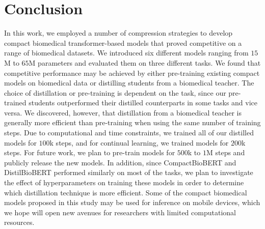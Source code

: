 \documentclass{article}
\begin{document}
\label{disc}

\section{Conclusion}
\label{concl}
In this work, we employed a number of compression strategies to develop compact biomedical transformer-based models that proved competitive on a range of biomedical datasets. We introduced six different models ranging from $15$M to $65$M parameters and evaluated them on three different tasks. We found that competitive performance may be achieved by either pre-training existing compact models on biomedical data or distilling students from a biomedical teacher. The choice of distillation or pre-training is dependent on the task, since our pre-trained students outperformed their distilled counterparts in some tasks and vice versa.
We discovered, however, that distillation from a biomedical teacher is generally more efficient than pre-training when using the same number of training steps. Due to computational and time constraints, we trained all of our distilled models for $100$k steps, and for continual learning, we trained models for $200$k steps. For future work, we plan to pre-train models for $500$k to $1$M steps and publicly release the new models. In addition, since CompactBioBERT and DistilBioBERT performed similarly on most of the tasks, we plan to investigate the effect of hyperparameters on training these models in order to determine which distillation technique is more efficient. Some of the compact biomedical models proposed in this study may be used for inference on mobile devices, which we hope will open new avenues for researchers with limited computational resources.
\end{document}
